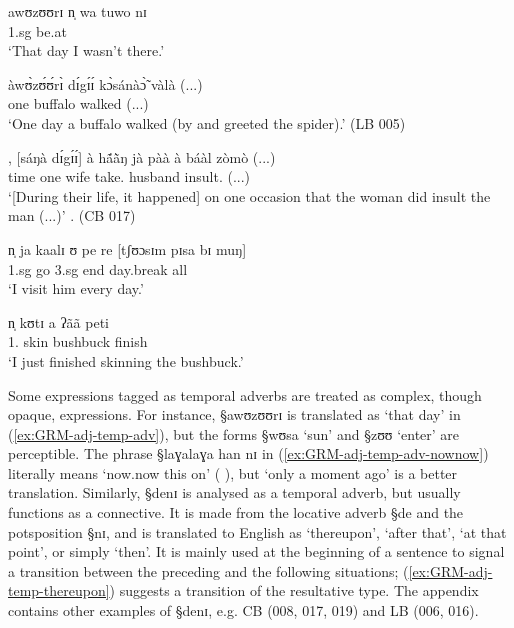 \begin{exe}
\ex\label{ex:GRM-adj-temp-adv}
\begin{xlist}
\ex\label{ex:GRM-adj-temp-adv-thatday}

\gll awʊzʊʊrɪ n̩ wa tuwo nɪ  \\
{\advt} {\sc 1.sg} {\neg} {be.at} {\postp}\\
\glt `That day I wasn't there.'


\ex\label{ex:GRM-adj-temp-adv-LB5}

\gll àwʊ̀zʊ́ʊ́rɪ̀  dɪ́gɪ́ɪ́    	     kɔ̀sánàɔ̃̀ 	vàlà 	 (...)\\
{\advt}  one           buffalo  	walked (...) \\
\glt `One day a buffalo walked (by and greeted the spider).' (LB 005)

\ex\label{ex:GRM-adj-temp-adv-CB17}
\gll [dénɪ̀],         [sáŋà      dɪ́gɪ́ɪ́]    	   à   
hã́ã̀ŋ jà 	pàà  	à   	báàl    	   zòmò  (...) \\
{\advt}    time      one      	   {\art}	wife   	{\hab} 	take.{\pl} 
{\art} husband insult.{\pl} (...)\\
\glt `[During their life, it happened] on one occasion that the woman
did insult  the man (...)' .  (CB 017)

\ex\label{ex:GRM-adj-temp-adv-everyday}
\gll  n̩ ja kaalɪ ʊ pe re [{tʃʊɔsɪm pɪsa} bɪ muŋ]\\
 {\sc 1.sg}    {\hab} go {\sc 3.sg} end {\foc} day.break {\itr} all\\
\glt `I visit him every day.'

\ex\label{ex:GRM-adj-temp-adv-nownow}
 n̩ kʊtɪ a ʔãã peti\\
{\advt} {\dem} {\postp} {1.\sg} {skin} {\art} bushbuck  finish\\
\glt `I  just finished skinning the bushbuck.'

\end{xlist}
\end{exe}


Some expressions tagged as temporal adverbs are treated as complex, though
opaque, expressions. For instance,  {\S awʊzʊʊrɪ} is translated as  `that
day' in (\ref{ex:GRM-adj-temp-adv}), but the forms {\S wʊsa} `sun' and
{\S zʊʊ} `enter'  are perceptible. The phrase {\S laɣalaɣa han nɪ} in
(\ref{ex:GRM-adj-temp-adv-nownow}) literally
means `now.now this on' ({\advt} {\dem} {\postp}), but `only a moment
ago'  is a better translation.  Similarly, {\S denɪ} is analysed as a
temporal adverb, but usually functions as a connective. It is made from  the
locative adverb {\S de} and the potsposition {\S nɪ}, and is translated to
English as `thereupon', `after that', `at that point', or simply `then'. It is
mainly used at the beginning of a sentence to signal a transition  between the
preceding  and the following situations;
(\ref{ex:GRM-adj-temp-thereupon}) suggests a transition of the resultative type.
The appendix contains other examples of {\S denɪ}, e.g.  CB (008, 017, 019)
and 
LB (006, 016).


